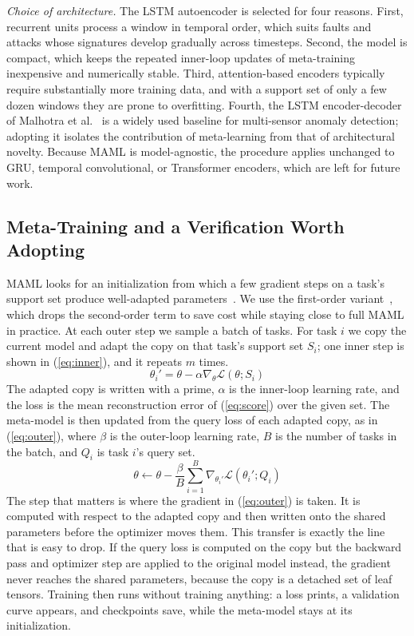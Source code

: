 \documentclass[conference]{IEEEtran}
\begin{document}
\textit{Choice of architecture.} The LSTM autoencoder is selected for four
reasons. First, recurrent units process a window in temporal order, which
suits faults and attacks whose signatures develop gradually across
timesteps. Second, the model is compact, which keeps the repeated
inner-loop updates of meta-training inexpensive and numerically stable.
Third, attention-based encoders typically require substantially more
training data, and with a support set of only a few dozen windows they are
prone to overfitting. Fourth, the LSTM encoder-decoder of Malhotra et
al.~\cite{malhotra2016} is a widely used baseline for multi-sensor anomaly
detection; adopting it isolates the contribution of meta-learning from that
of architectural novelty. Because MAML is model-agnostic, the procedure
applies unchanged to GRU, temporal convolutional, or Transformer encoders,
which are left for future work.

\subsection{Meta-Training and a Verification Worth Adopting}
\label{sec:verify}

MAML looks for an initialization from which a few gradient steps on a
task's support set produce well-adapted parameters~\cite{finn2017}. We use
the first-order variant~\cite{antoniou2019}, which drops the second-order
term to save cost while staying close to full MAML in practice. At each
outer step we sample a batch of tasks. For task $i$ we copy the current
model and adapt the copy on that task's support set $S_i$; one inner step is
shown in (\ref{eq:inner}), and it repeats $m$ times.
\begin{equation}
\theta_i' = \theta - \alpha \nabla_{\theta}\mathcal{L}(\theta; S_i)
\label{eq:inner}
\end{equation}
The adapted copy is written with a prime, $\alpha$ is the inner-loop
learning rate, and the loss is the mean reconstruction error of
(\ref{eq:score}) over the given set. The meta-model is then updated from the
query loss of each adapted copy, as in (\ref{eq:outer}), where $\beta$ is
the outer-loop learning rate, $B$ is the number of tasks in the batch, and
$Q_i$ is task $i$'s query set.
\begin{equation}
\theta \leftarrow \theta - \frac{\beta}{B}\sum_{i=1}^{B}
\nabla_{\theta_i'}\mathcal{L}(\theta_i'; Q_i)
\label{eq:outer}
\end{equation}
The step that matters is where the gradient in (\ref{eq:outer}) is taken. It
is computed with respect to the adapted copy and then written onto the
shared parameters before the optimizer moves them. This transfer is exactly
the line that is easy to drop. If the query loss is computed on the copy but
the backward pass and optimizer step are applied to the original model
instead, the gradient never reaches the shared parameters, because the copy
is a detached set of leaf tensors. Training then runs without training
anything: a loss prints, a validation curve appears, and checkpoints save,
while the meta-model stays at its initialization.
\end{document}
